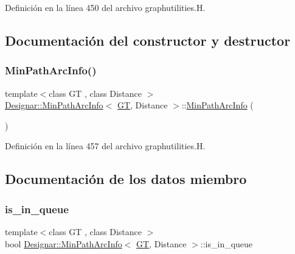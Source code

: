Definición en la línea 450 del archivo graphutilities.\+H.



\subsection{Documentación del constructor y destructor}
\mbox{\label{class_designar_1_1_min_path_arc_info_a243f02fd41ed0786f6f2d907843d0598}} 
\subsubsection{\texorpdfstring{Min\+Path\+Arc\+Info()}{MinPathArcInfo()}}
{\footnotesize\ttfamily template$<$class GT , class Distance $>$ \\
\hyperlink{class_designar_1_1_min_path_arc_info}{Designar\+::\+Min\+Path\+Arc\+Info}$<$ \hyperlink{demo-buildgraph_8_c_a3001c40d2c31ca87ed96cd7d1334a55e}{GT}, Distance $>$\+::\hyperlink{class_designar_1_1_min_path_arc_info}{Min\+Path\+Arc\+Info} (\begin{DoxyParamCaption}{ }\end{DoxyParamCaption})\hspace{0.3cm}{\ttfamily [inline]}}



Definición en la línea 457 del archivo graphutilities.\+H.



\subsection{Documentación de los datos miembro}
\mbox{\label{class_designar_1_1_min_path_arc_info_a97d17f60e2e02381708f68b79c6bf82d}} 
\subsubsection{\texorpdfstring{is\+\_\+in\+\_\+queue}{is\_in\_queue}}
{\footnotesize\ttfamily template$<$class GT , class Distance $>$ \\
bool \hyperlink{class_designar_1_1_min_path_arc_info}{Designar\+::\+Min\+Path\+Arc\+Info}$<$ \hyperlink{demo-buildgraph_8_c_a3001c40d2c31ca87ed96cd7d1334a55e}{GT}, Distance $>$\+::is\+\_\+in\+\_\+queue}




